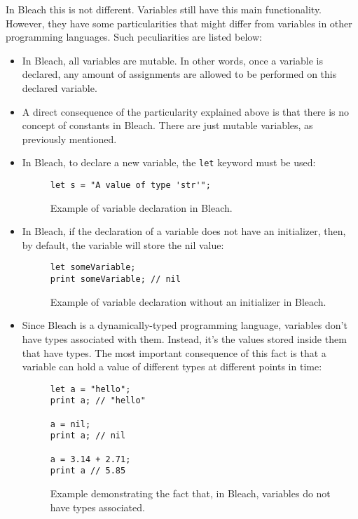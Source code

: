 In Bleach this is not different. Variables still have this main functionality. However, they have some particularities that might differ from variables in other programming languages. Such peculiarities are listed below:
\begin{itemize}
    \item In Bleach, all variables are mutable. In other words, once a variable is declared, any amount of assignments are allowed to be performed on this declared variable.
    
    \item A direct consequence of the particularity explained above is that there is no concept of constants in Bleach. There are just mutable variables, as previously mentioned.
    
    \item In Bleach, to declare a new variable, the \texttt{let} keyword must be used:
    \begin{figure}[H]
        \centering
        \begin{lstlisting}
let s = "A value of type 'str'";
        \end{lstlisting}
        \caption{Example of variable declaration in Bleach.}
    \end{figure}
    
    \item In Bleach, if the declaration of a variable does not have an initializer, then, by default, the variable will store the nil value:
    \begin{figure}[H]
        \centering
        \begin{lstlisting}
let someVariable;
print someVariable; // nil
        \end{lstlisting}
        \caption{Example of variable declaration without an initializer in Bleach.}
    \end{figure}

    \item Since Bleach is a dynamically-typed programming language, variables don't have types associated with them. Instead, it's the values stored inside them that have types. The most important consequence of this fact is that a variable can hold a value of different types at different points in time:
    \begin{figure}[H]
        \centering
        \begin{lstlisting}
let a = "hello";
print a; // "hello"

a = nil;
print a; // nil

a = 3.14 + 2.71;
print a // 5.85
        \end{lstlisting}
        \caption{Example demonstrating the fact that, in Bleach, variables do not have types associated.}
    \end{figure}
\end{itemize}

